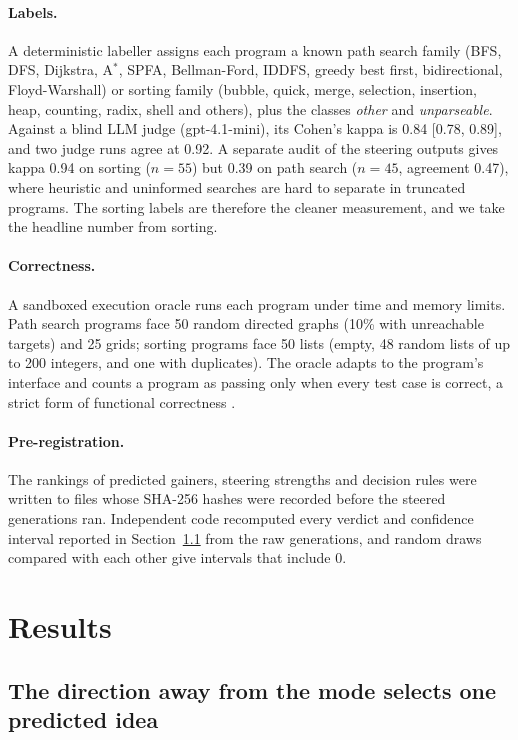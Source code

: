 \documentclass[11pt,letterpaper]{article}
\newcommand{\Astar}{A$^{*}$}
\begin{document}
\paragraph{Labels.} A deterministic labeller assigns each program a known path search family (BFS, DFS, Dijkstra, \Astar{}, SPFA, Bellman-Ford, IDDFS, greedy best first, bidirectional, Floyd-Warshall) or sorting family (bubble, quick, merge, selection, insertion, heap, counting, radix, shell and others), plus the classes \emph{other} and \emph{unparseable}. Against a blind LLM judge (gpt-4.1-mini), its Cohen's kappa \citep{Cohen1960} is 0.84 [0.78, 0.89], and two judge runs agree at 0.92. A separate audit of the steering outputs gives kappa 0.94 on sorting ($n = 55$) but 0.39 on path search ($n = 45$, agreement 0.47), where heuristic and uninformed searches are hard to separate in truncated programs. The sorting labels are therefore the cleaner measurement, and we take the headline number from sorting.

\paragraph{Correctness.} A sandboxed execution oracle runs each program under time and memory limits. Path search programs face 50 random directed graphs (10\% with unreachable targets) and 25 grids; sorting programs face 50 lists (empty, 48 random lists of up to 200 integers, and one with duplicates). The oracle adapts to the program's interface and counts a program as passing only when every test case is correct, a strict form of functional correctness \citep{Chen2021}.

\paragraph{Pre-registration.} The rankings of predicted gainers, steering strengths and decision rules were written to files whose SHA-256 hashes were recorded before the steered generations ran. Independent code recomputed every verdict and confidence interval reported in Section~\ref{sec:res-select} from the raw generations, and random draws compared with each other give intervals that include 0.

\section{Results}
\label{sec:results}

\subsection{The direction away from the mode selects one predicted idea}
\label{sec:res-select}
\end{document}
